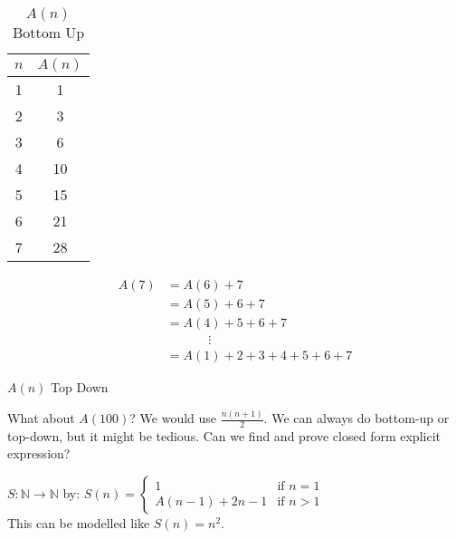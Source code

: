 \documentclass{article}
\newcommand{\N}{\ensuremath{\mathbb{N}}}
\begin{document}
        \begin{table}[h]
            \centering
            \begin{tabular}{c|c}
                $n$ & $A(n)$ \\
                \hline
                1 & 1 \\
                2 & 3 \\
                3 & 6 \\
                4 & 10 \\
                5 & 15 \\
                6 & 21 \\
                7 & 28
            \end{tabular}
            \caption{$A(n)$ Bottom Up}
            \label{Bottom Up A(n)}
        \end{table}

        \begin{table}[h]
            \centering
            \begin{align*}
                A(7) &= A(6) + 7 \\
                &= A(5) +6 + 7 \\
                &= A(4) + 5 + 6 + 7 \\
                &\ \ \ \ \ \ \ \ \ \ \ \ \ \ \ \vdots \\
                &= A(1) + 2 + 3 + 4 + 5 + 6 + 7
            \end{align*}
            \caption{$A(n)$ Top Down}
            \label{Top Down A(n)}
        \end{table}

        What about $A(100)$? We would use $\frac{n(n+1)}{2}$. We can always do bottom-up or top-down, but it might be tedious. Can we find and prove closed form explicit expression?

\newpage

        $S\colon \N \rightarrow \N$ by: 
        $S(n) =$$
        \begin{cases} 
            1 & \text{if } n = 1 \\
            A(n-1) + 2n - 1 & \text{if } n > 1
        \end{cases} $ \\
        
        This can be modelled like $S(n) = n^2$. \\

        \vspace{0.3cm}
\end{document}
